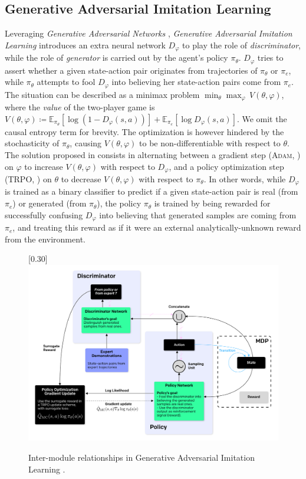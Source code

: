 \subsection*{Generative Adversarial Imitation Learning}

Leveraging \textit{Generative Adversarial Networks} \cite{Goodfellow2014-yk},
\textit{Generative Adversarial Imitation Learning} \cite{Ho2016-bv}
introduces an extra neural network $D_\varphi$
to play the role of \textit{discriminator}, while the role of
\textit{generator} is carried out by the agent's policy $\pi_\theta$.
$D_\varphi$ tries to assert whether a given state-action pair
originates from trajectories of $\pi_\theta$ or $\pi_e$, while $\pi_\theta$
attempts to fool $D_\varphi$ into believing her state-action pairs come from
$\pi_e$.
The situation can be described as a minimax problem
$\min_\theta \max_\varphi \, V(\theta, \varphi)$, where
the \textit{value} of the two-player game is
$V(\theta, \varphi) \coloneqq
\mathbb{E}_{\pi_\theta}[\log (1 - D_\varphi(s, a))]
+ \mathbb{E}_{\pi_e}[\log D_\varphi(s, a)]$.
We omit the causal entropy term for brevity.
The optimization is however hindered by the stochasticity
of $\pi_\theta$,
causing $V(\theta, \varphi)$ to be non-differentiable with respect to $\theta$.
The solution proposed in \cite{Ho2016-bv} consists in alternating between a
gradient step (\textsc{Adam}, \cite{Kingma2014-op}) on $\varphi$ to increase
$V(\theta, \varphi)$ with respect to $D_\varphi$, and a policy optimization step
(TRPO, \cite{Schulman2015-jt}) on $\theta$ to decrease $V(\theta, \varphi)$ with
respect to $\pi_\theta$.
In other words, while $D_\varphi$ is trained as a binary classifier to predict if
a given state-action pair is real (from $\pi_e$) or generated (from
$\pi_\theta$), the policy $\pi_\theta$ is trained by being rewarded for
successfully confusing $D_\varphi$ into believing that generated samples are coming
from $\pi_e$, and treating this reward as if it were an external
analytically-unknown reward from the environment.

\begin{figure}[h!]
\center
\scalebox{0.30}[0.30]{\includegraphics{Diags/gail_big}}
\caption{Inter-module relationships in
Generative Adversarial Imitation Learning \cite{Ho2016-bv}.}
\label{fig:gail_big}
\end{figure}

